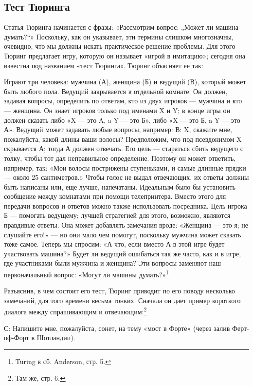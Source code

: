 \documentclass[../main.tex]{subfiles}
\begin{document}
\subsection{Тест Тюринга}

Статья Тюринга начинается с фразы: «Рассмотрим вопрос: „Может ли машина думать?{}``» Поскольку, как он указывает, эти термины слишком многозначны, очевидно, что мы должны искать практическое решение проблемы. Для этого Тюринг предлагает игру, которую он называет «игрой в имитацию»; сегодня она известна под названием «тест Тюринга». Тюринг объясняет ее так:

Играют три человека: мужчина (А), женщина (Б) и ведущий (В), который может быть любого пола. Ведущий закрывается в отдельной комнате. Он должен, задавая вопросы, определить по ответам, кто из двух игроков --- мужчина и кто --- женщина. Он знает игроков только под именами X и Y; в конце игры он должен сказать либо «X --- это A, a Y --- это Б», либо «X --- это Б, a Y --- это А». Ведущий может задавать любые вопросы, например: В: X, скажите мне, пожалуйста, какой длины ваши волосы? Предположим, что под псевдонимом X скрывается А; тогда А должен отвечать. Его цель --- стараться сбить ведущего с толку, чтобы тот дал неправильное определение. Поэтому он может ответить, например, так: «Мои волосы пострижены ступеньками, и самые длинные прядки --- около 25 сантиметров.» Чтобы голос не выдал отвечающих, их ответы должны быть написаны или, еще лучше, напечатаны. Идеальным было бы установить сообщение между комнатами при помощи телепринтера. Вместо этого для передачи вопросов и ответов можно также использовать посредника. Цель игрока Б --- помогать ведущему; лучшей стратегией для этого, возможно, являются правдивые ответы. Она может добавлять замечания вроде: «Женщина --- это я; не слушайте его!» --- но они мало чем помогут, поскольку мужчина может сказать тоже самое. Теперь мы спросим: «А что, если вместо А в этой игре будет участвовать машина?» Будет ли ведущий ошибаться так же часто, как и в игре, где участниками были мужчина и женщина? Эти вопросы заменяют наш первоначальный вопрос: «Могут ли машины думать?»\footnote{Turing в сб. Anderson, стр. 5.}

Разъяснив, в чем состоит его тест, Тюринг приводит по его поводу несколько замечаний, для того времени весьма тонких. Сначала он дает пример короткого диалога между спрашивающим и отвечающим:\footnote{Там же, стр. 6.}

С: Напишите мне, пожалуйста, сонет, на тему «мост в Форте» (через залив Ферт-оф-Форт в Шотландии).
\end{document}
